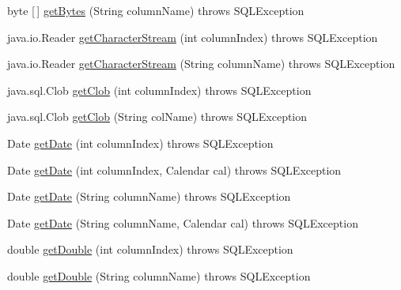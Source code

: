 \begin{DoxyCompactItemize}
\item 
byte \mbox{[}$\,$\mbox{]} \mbox{\hyperlink{classcom_1_1mysql_1_1cj_1_1jdbc_1_1result_1_1_result_set_impl_a2d50a785cfd099214bdf90ec5090d864}{get\+Bytes}} (String column\+Name)  throws S\+Q\+L\+Exception 
\item 
java.\+io.\+Reader \mbox{\hyperlink{classcom_1_1mysql_1_1cj_1_1jdbc_1_1result_1_1_result_set_impl_a77ab823ed66ea7e92f016344e1aee7b7}{get\+Character\+Stream}} (int column\+Index)  throws S\+Q\+L\+Exception 
\item 
java.\+io.\+Reader \mbox{\hyperlink{classcom_1_1mysql_1_1cj_1_1jdbc_1_1result_1_1_result_set_impl_a86147d71382fd6090a1e830436849670}{get\+Character\+Stream}} (String column\+Name)  throws S\+Q\+L\+Exception 
\item 
java.\+sql.\+Clob \mbox{\hyperlink{classcom_1_1mysql_1_1cj_1_1jdbc_1_1result_1_1_result_set_impl_a112a8c3b13c1c93a7e4250a8c5d28c80}{get\+Clob}} (int column\+Index)  throws S\+Q\+L\+Exception 
\item 
java.\+sql.\+Clob \mbox{\hyperlink{classcom_1_1mysql_1_1cj_1_1jdbc_1_1result_1_1_result_set_impl_ac65c4395ad98c2b6a46d2fa2da01e7a3}{get\+Clob}} (String col\+Name)  throws S\+Q\+L\+Exception 
\item 
Date \mbox{\hyperlink{classcom_1_1mysql_1_1cj_1_1jdbc_1_1result_1_1_result_set_impl_ae39664e465671fa88e85e51e7d357f53}{get\+Date}} (int column\+Index)  throws S\+Q\+L\+Exception 
\item 
Date \mbox{\hyperlink{classcom_1_1mysql_1_1cj_1_1jdbc_1_1result_1_1_result_set_impl_a3ffda85e2b98127bd0a82c3e77be7d7f}{get\+Date}} (int column\+Index, Calendar cal)  throws S\+Q\+L\+Exception 
\item 
Date \mbox{\hyperlink{classcom_1_1mysql_1_1cj_1_1jdbc_1_1result_1_1_result_set_impl_ac4587f60311a7d0b9bd982bbd479a0c5}{get\+Date}} (String column\+Name)  throws S\+Q\+L\+Exception 
\item 
Date \mbox{\hyperlink{classcom_1_1mysql_1_1cj_1_1jdbc_1_1result_1_1_result_set_impl_a70c77a5060e332254de3a315a557cffb}{get\+Date}} (String column\+Name, Calendar cal)  throws S\+Q\+L\+Exception 
\item 
double \mbox{\hyperlink{classcom_1_1mysql_1_1cj_1_1jdbc_1_1result_1_1_result_set_impl_a42f19b9e53cf5a2033cba1a5f0b9b8fa}{get\+Double}} (int column\+Index)  throws S\+Q\+L\+Exception 
\item 
double \mbox{\hyperlink{classcom_1_1mysql_1_1cj_1_1jdbc_1_1result_1_1_result_set_impl_a1edcddf955e3da3306166045449597ac}{get\+Double}} (String column\+Name)  throws S\+Q\+L\+Exception 

\end{DoxyCompactItemize}
